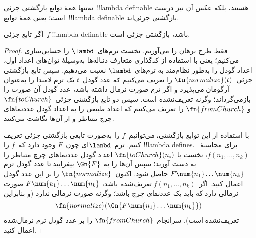 \documentclass[../../../include/open-logic-section]{subfiles}
\begin{document}

نه‌تنها همهٔ توابع بازگشتی جزئی~!!{lambda definable} هستند، بلکه عکس
آن نیز درست است؛ یعنی همهٔ توابع~!!{lambda definable} بازگشتی جزئی‌اند.

\begin{thm}
   اگر تابع جزئی~$f$
  !!{lambda definable} باشد، بازگشتی جزئی است.
\end{thm}

\begin{proof}
  فقط طرح برهان را می‌آوریم. نخست ترم‌های~$\lambd$ را حسابی‌سازی
  می‌کنیم؛ یعنی با استفاده از کدگذاری متعارف دنباله‌ها به‌وسیلهٔ توان‌های
  اعداد اول، اعداد گودل را به‌طور نظام‌مند به ترم‌های~$\lambd$ نسبت
  می‌دهیم. سپس تابع بازگشتی جزئی~$\fn{normalize}(t)$ را تعریف می‌کنیم
  که عدد گودل~$t$ یک ترم لامبدا را به‌عنوان آرگومان می‌پذیرد و اگر ترم
  صورت نرمال داشته باشد، عدد گودل آن صورت را بازمی‌گرداند؛ وگرنه
  تعریف‌نشده است. سپس دو تابع بازگشتی جزئی~$\fn{toChurch}$ و
  $\fn{fromChurch}$ را تعریف می‌کنیم که اعداد طبیعی را به اعداد گودل
  عددنماهای چرچ متناظر و از آن‌ها نگاشت می‌کنند.

  با استفاده از این توابع بازگشتی، می‌توانیم~$f$ را به‌صورت تابعی
  بازگشتی جزئی تعریف کنیم. ترم~$\lambd$ای چون~$F$ وجود دارد که~$f$ را
  !!{lambda define}s. برای محاسبهٔ~$f(n_1, \dots, n_k)$، نخست با
  $\fn{toChurch}(n_i)$ اعداد گودل عددنماهای چرچ متناظر را به دست آورید؛
  سپس آن‌ها را به~$\Gn{F}$ بیفزایید تا عدد گودل ترم
  $F \num{n_1}\dots\num{n_k}$ حاصل شود. اکنون~$\fn{normalize}$ را بر
  این عدد گودل اعمال کنید. اگر~$f(n_1, \dots, n_k)$ تعریف‌شده باشد،
  $F \num{n_1}\dots\num{n_k}$ صورت نرمالی دارد که باید یک عددنمای چرچ
  باشد؛ وگرنه صورت نرمالی ندارد (و بنابراین
  \[\fn{normalize}(\Gn{F\num{n_1}\dots\num{n_k}})\]
  تعریف‌نشده است). سرانجام~$\fn{fromChurch}$ را بر عدد گودل ترم
  نرمال‌شده اعمال کنید.
\end{proof}
\end{document}

